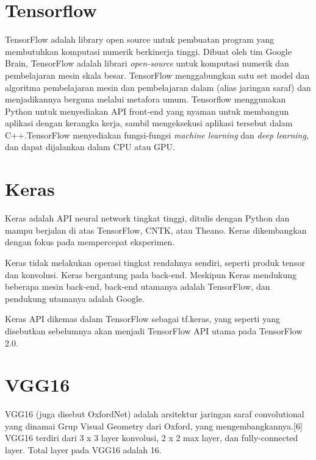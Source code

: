 \section{Tensorflow}
\par TensorFlow adalah library open source untuk pembuatan program yang membutuhkan komputasi numerik berkinerja tinggi. Dibuat oleh tim Google Brain, TensorFlow adalah librari \textit{open-source} untuk komputasi numerik dan pembelajaran mesin skala besar. TensorFlow menggabungkan satu set model dan algoritma pembelajaran mesin dan pembelajaran dalam (alias jaringan saraf) dan menjadikannya berguna melalui metafora umum. Tensorflow menggunakan Python untuk menyediakan API front-end yang nyaman untuk membangun aplikasi dengan kerangka kerja, sambil mengeksekusi aplikasi tersebut dalam C++.TensorFlow menyediakan fungsi-fungsi \textit{machine learning} dan \textit{deep learning}, dan dapat dijalankan dalam CPU atau GPU\cite{tensorflow_def}.

\section{Keras}
\par Keras adalah API neural network tingkat tinggi, ditulis dengan Python dan mampu berjalan di atas TensorFlow, CNTK, atau Theano. Keras dikembangkan dengan fokus pada mempercepat eksperimen\cite{keras_def}.
\par Keras tidak melakukan operasi tingkat rendahnya sendiri, seperti produk tensor dan konvolusi. Keras bergantung pada back-end. Meskipun Keras mendukung beberapa mesin back-end, back-end utamanya adalah TensorFlow, dan pendukung utamanya adalah Google. 
\par Keras API dikemas dalam TensorFlow sebagai tf.keras, yang seperti yang disebutkan sebelumnya akan menjadi TensorFlow API utama pada TensorFlow 2.0.

\section{VGG16}
\par VGG16 (juga disebut OxfordNet) adalah arsitektur jaringan saraf convolutional yang dinamai Grup Visual Geometry dari Oxford, yang mengembangkannya.[6] VGG16 terdiri dari 3 x 3 layer konvolusi, 2 x 2 max layer, dan fully-connected layer. Total layer pada VGG16 adalah 16\cite{vgg16_def}.

